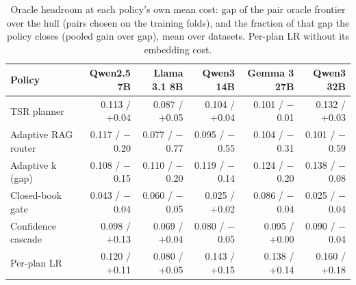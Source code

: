 \begin{table}[t]
\centering\small
\setlength{\tabcolsep}{4pt}
\caption{Oracle headroom at each policy's own mean cost: gap of the pair oracle frontier over the hull (pairs chosen on the training folds), and the fraction of that gap the policy closes (pooled gain over gap), mean over datasets. Per-plan LR without its embedding cost.}
\label{tab:review_headroom}
\begin{tabular*}{\linewidth}{@{\extracolsep{\fill}}lrrrrr}
\toprule
Policy & Qwen2.5 7B & Llama 3.1 8B & Qwen3 14B & Gemma 3 27B & Qwen3 32B \\
\midrule
TSR planner & 0.113 / +0.04 & 0.087 / +0.05 & 0.104 / +0.04 & 0.101 / $-$0.01 & 0.132 / +0.03 \\
Adaptive RAG router & 0.117 / $-$0.20 & 0.077 / $-$0.77 & 0.095 / $-$0.55 & 0.104 / $-$0.31 & 0.101 / $-$0.59 \\
Adaptive k (gap) & 0.108 / $-$0.15 & 0.110 / $-$0.20 & 0.119 / $-$0.14 & 0.124 / $-$0.20 & 0.138 / $-$0.08 \\
Closed-book gate & 0.043 / $-$0.04 & 0.060 / $-$0.05 & 0.025 / +0.02 & 0.086 / $-$0.04 & 0.025 / $-$0.04 \\
Confidence cascade & 0.098 / +0.13 & 0.069 / +0.04 & 0.080 / $-$0.05 & 0.095 / +0.00 & 0.090 / $-$0.04 \\
Per-plan LR & 0.120 / +0.11 & 0.080 / +0.05 & 0.143 / +0.15 & 0.138 / +0.14 & 0.160 / +0.18 \\
\bottomrule
\end{tabular*}
\end{table}
